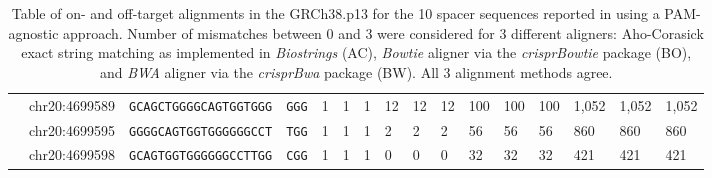 \documentclass[pdftex,english,10pt]{article}
\begin{document}
{\begin{table}[h]
{\begin{tabular}{|l|lll|llllllllllll|}
                                           & chr20:4699589                                         & \texttt{GCAGCTGGGGCAGTGGTGGG}                        & \texttt{GGG}                                       & 1                     &           1                 & \multicolumn{1}{l|}{1}    & 12                    & 12                          & \multicolumn{1}{l|}{12}    & 100                    &       100                     & \multicolumn{1}{l|}{100}    & 1,052                 &  1,052                          &      1,052                    \\
                                           & chr20:4699595                                         & \texttt{GGGGCAGTGGTGGGGGGCCT}                        & \texttt{TGG}                                       & 1                     &         1                  & \multicolumn{1}{l|}{1}   & 2                     &      2                      & \multicolumn{1}{l|}{2}    & 56                    & 56                         & \multicolumn{1}{l|}{56}    & 860                   & 860                           &      860                     \\
                                           & chr20:4699598                                         & \texttt{GCAGTGGTGGGGGGCCTTGG}                        & \texttt{CGG}                                       & 1                     &          1                  & \multicolumn{1}{l|}{1}    & 0                     &      0                      & \multicolumn{1}{l|}{0}    & 32                    &   32                         & \multicolumn{1}{l|}{32}    & 421                   &           421                   &        421                  \\ \hline
\end{tabular}
}
\caption{Table of on- and off-target alignments in the GRCh38.p13 for the 10 spacer sequences reported in \citet{multicrispr} using a PAM-agnostic approach. Number of mismatches between 0 and 3 were considered for 3 different aligners: Aho-Corasick exact string matching as implemented in \textit{Biostrings} (AC), \textit{Bowtie} aligner via the \textit{crisprBowtie} package (BO), and \textit{BWA} aligner via the \textit{crisprBwa} package (BW). All 3 alignment methods agree. }
\label{supptab:offtargets}
\end{table}



}
\end{document}
